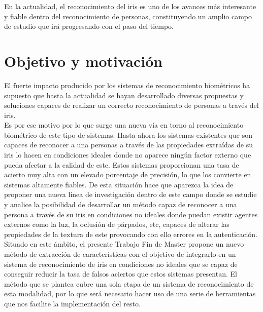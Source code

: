 En la actualidad, el reconocimiento del iris es uno de los avances más interesante y fiable dentro del reconocimiento de personas, constituyendo un amplio campo de estudio que irá progresando con el paso del tiempo. \\



\section{Objetivo y motivación}

El fuerte impacto producido por los sistemas de reconocimiento biométricos ha supuesto que hasta la actualidad se hayan desarrollado diversas propuestas y soluciones capaces de realizar un correcto reconocimiento de personas a través del iris.\\

Es por ese motivo por lo que surge una nueva vía en torno al reconocimiento biométrico de este tipo de sistemas. Hasta ahora los sistemas existentes que son capaces de reconocer a una personas a través de las propiedades extraídas de su iris lo hacen en condiciones ideales donde no aparece ningún factor externo que pueda afectar a la calidad de este. Estos sistemas proporcionan una tasa de acierto muy alta con un elevado porcentaje de precisión, lo que los convierte en sistemas altamente fiables. De esta situación hace que aparezca la idea de proponer una nueva línea de investigación dentro de este campo donde se estudie y analice la posibilidad de desarrollar un método capaz de reconocer a una persona a través de su iris en condiciones no ideales donde puedan existir agentes externos como la luz, la oclusión de párpados, etc, capaces de alterar las propiedades de la textura de este provocando con ello errores en la autenticación.  \\

Situado en este ámbito, el presente Trabajo Fin de Master propone un nuevo método de extracción de características con el objetivo de integrarlo en un sistema de reconocimiento de iris en condiciones no ideales que se capaz de conseguir reducir la tasa de falsos aciertos que estos sistemas presentan. El método que se plantea cubre una sola etapa de un sistema de reconocimiento de esta modalidad, por lo que será necesario hacer uso de una serie de herramientas que nos facilite la implementación del resto. \\

